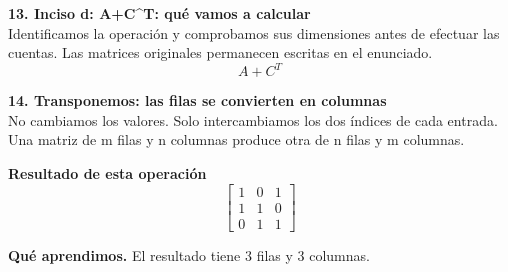 \documentclass[11pt,a4paper,landscape]{article}
\begin{document}
\noindent\begin{minipage}{\linewidth}\textbf{13. Inciso d: A+C\textasciicircum{}T: qué vamos a calcular}\\[2pt]Identificamos la operación y comprobamos sus dimensiones antes de efectuar las cuentas. Las matrices originales permanecen escritas en el enunciado.
\[A+C^T\]
\end{minipage}\par\medskip
\noindent\begin{minipage}{\linewidth}\textbf{14. Transponemos: las filas se convierten en columnas}\\[2pt]No cambiamos los valores. Solo intercambiamos los dos índices de cada entrada. Una matriz de m filas y n columnas produce otra de n filas y m columnas.
\par{}\par\smallskip
\par\smallskip \textbf{Resultado de esta operación}\[\begin{bmatrix}1 & 0 & 1\\1 & 1 & 0\\0 & 1 & 1\end{bmatrix}\]
\par\smallskip\textbf{Qué aprendimos.} El resultado tiene 3 filas y 3 columnas.
\end{minipage}\par\medskip
\end{document}
